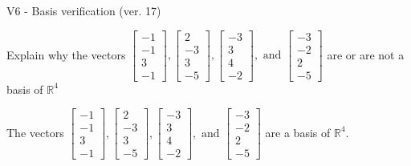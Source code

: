 \begin{exercise}
  \begin{exerciseTitle}V6 - Basis verification (ver. 17)\end{exerciseTitle}
  \begin{exerciseStatement}
    Explain why the vectors \(\left[\begin{array}{r}
-1 \\
-1 \\
3 \\
-1
\end{array}\right] , \left[\begin{array}{r}
2 \\
-3 \\
3 \\
-5
\end{array}\right] , \left[\begin{array}{r}
-3 \\
3 \\
4 \\
-2
\end{array}\right] , \text{ and } \left[\begin{array}{r}
-3 \\
-2 \\
2 \\
-5
\end{array}\right]\) are or are not a basis of \(\mathbb{R}^4\)	


  \end{exerciseStatement}
  \begin{exerciseAnswer}
   The vectors \(\left[\begin{array}{r}
-1 \\
-1 \\
3 \\
-1
\end{array}\right] , \left[\begin{array}{r}
2 \\
-3 \\
3 \\
-5
\end{array}\right] , \left[\begin{array}{r}
-3 \\
3 \\
4 \\
-2
\end{array}\right] , \text{ and } \left[\begin{array}{r}
-3 \\
-2 \\
2 \\
-5
\end{array}\right]\) 
  	 are  a basis of \(\mathbb{R}^4\).
  


  \end{exerciseAnswer}
\end{exercise}